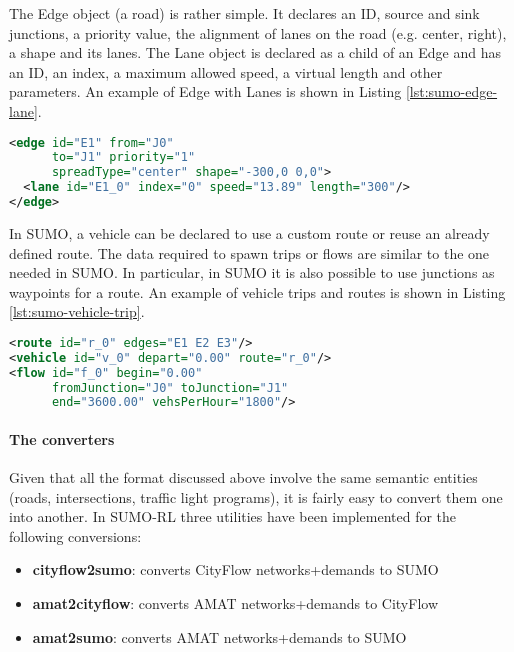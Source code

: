 The Edge object (a road) is rather simple. It declares an ID, source and sink junctions, a priority value, the alignment of lanes on the road (e.g. center, right), a shape and its lanes.
The Lane object is declared as a child of an Edge and has an ID, an index, a maximum allowed speed, a virtual length and other parameters.
An example of Edge with Lanes is shown in Listing \ref{lst:sumo-edge-lane}.

\noindent
\begin{minipage}{\linewidth}
\begin{lstlisting}[language=XML, caption=Example of Edge declaration in SUMO format, label={lst:sumo-edge-lane}]
<edge id="E1" from="J0"
      to="J1" priority="1"
      spreadType="center" shape="-300,0 0,0">
  <lane id="E1_0" index="0" speed="13.89" length="300"/>
</edge>
\end{lstlisting}
\end{minipage}

In SUMO, a vehicle can be declared to use a custom route or reuse an already defined route.
The data required to spawn trips or flows are similar to the one needed in SUMO.
In particular, in SUMO it is also possible to use junctions as waypoints for a route.
An example of vehicle trips and routes is shown in Listing \ref{lst:sumo-vehicle-trip}.

\noindent
\begin{minipage}{\linewidth}
\begin{lstlisting}[language=XML, caption=Example of vehicle trip and route declaration in SUMO format, label={lst:sumo-vehicle-trip}]
<route id="r_0" edges="E1 E2 E3"/>
<vehicle id="v_0" depart="0.00" route="r_0"/>
<flow id="f_0" begin="0.00"
      fromJunction="J0" toJunction="J1"
      end="3600.00" vehsPerHour="1800"/>
\end{lstlisting}
\end{minipage}

\paragraph{The converters}

Given that all the format discussed above involve the same semantic entities (roads, intersections, traffic light programs), it is fairly easy to convert them one into another.
In SUMO-RL three utilities have been implemented for the following conversions:

\begin{itemize}
  \item \textbf{cityflow2sumo}: converts CityFlow networks+demands to SUMO
  \item \textbf{amat2cityflow}: converts AMAT networks+demands to CityFlow
  \item \textbf{amat2sumo}: converts AMAT networks+demands to SUMO
\end{itemize}

